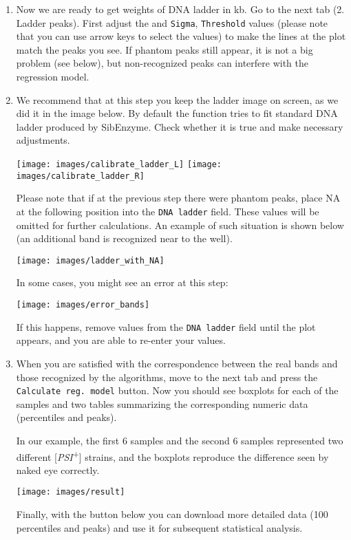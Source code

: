 \documentclass[11pt]{article}
\begin{document}
\begin{enumerate}
\item Now we are ready to get weights of DNA ladder in kb. Go to the next tab (2. Ladder peaks). First adjust the and \texttt{Sigma}, \texttt{Threshold} values (please note that you can use arrow keys to select the values) to make the lines at the plot match the peaks you see. If phantom peaks still appear, it is not a big problem (see below), but non-recognized peaks can interfere with the regression model.

\item We recommend that at this step you keep the ladder image on screen, as we did it in the image below. By default the function tries to fit standard DNA ladder produced by SibEnzyme. Check whether it is true and make necessary adjustments.

\texttt{[image: images/calibrate\_ladder\_L]}
\texttt{[image: images/calibrate\_ladder\_R]}


Please note that if at the previous step there were phantom peaks, place NA at the following position into the \texttt{DNA ladder} field. These values will be omitted for further calculations. An example of such situation is shown below (an additional band is recognized near to the well). 

\texttt{[image: images/ladder\_with\_NA]}

In some cases, you might see an error at this step:

\texttt{[image: images/error\_bands]}

If this happens, remove values from the \texttt{DNA ladder} field until the plot appears, and you are able to re-enter your values.  

\item When you are satisfied with the correspondence between the real bands and those recognized by the algorithms, move to the next tab and press the \texttt{Calculate reg.~model} button. 
Now you should see boxplots for each of the samples and two tables summarizing the corresponding numeric data (percentiles and peaks).  


In our example, the first 6 samples and the second 6 samples represented two different [\textit{PSI}\textsuperscript{+}] strains, and the boxplots reproduce the difference seen by naked eye correctly. 


\texttt{[image: images/result]}


Finally, with the button below you can download more detailed data (100 percentiles and peaks) and use it for subsequent statistical analysis. 



\end{enumerate}
\end{document}
